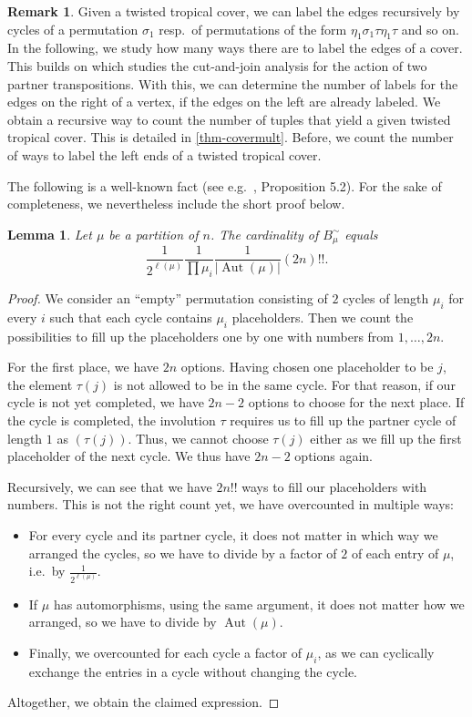 \documentclass[11pt]{article}
\newtheorem{lemma}[theo]{Lemma}
\theoremstyle{definition}
\newtheorem{rema}[theo]{Remark}
\numberwithin{equation}{section}
\DeclareMathOperator{\Aut}{Aut}
\begin{document}
\begin{rema}
    Given a twisted tropical cover, we can label the edges recursively by cycles of a permutation $\sigma_1$ resp.\ of permutations of the form $\eta_1\sigma_1\tau\eta_1\tau$ and so on. In the following, we study how many ways there are to label the edges of a cover. This builds on \cite[Theorem 2.12]{BF21} which studies the cut-and-join analysis for the action of two partner transpositions. With this, we can determine the number of labels for the edges on the right of a vertex, if the edges on the left are already labeled. We obtain a recursive way to count the number of tuples that yield a given twisted tropical cover. This is detailed in \cref{thm-covermult}. Before, we count the number of ways to label the left ends of a twisted tropical cover.
\end{rema}

The following is a well-known fact (see e.g.~\cite{goulden1996connection}, Proposition 5.2). For the sake of completeness, we nevertheless include the short proof below.
\begin{lemma}
\label{lem-conjclass}
Let $\mu$ be a partition of $n$.
The cardinality of $B^\sim_\mu$ equals
$$ \frac{1}{2^{\ell(\mu)}} \frac{1}{\prod \mu_i} \frac{1}{|\Aut(\mu)|}(2n)!! .$$
\end{lemma}

\begin{proof}
We consider an ``empty'' permutation consisting of $2$ cycles of length $\mu_i$ for every $i$ such that each cycle contains $\mu_i$ placeholders. Then we count the possibilities to fill up the placeholders one by one with numbers from $1,\ldots,2n$.

For the first place, we have $2n$ options. 
Having chosen one placeholder to be $j$, the element $\tau(j)$ is not allowed to be in the same cycle. For that reason, if our cycle is not yet completed, we have $2n-2$ options to choose for the next place. If the cycle is completed, the involution $\tau$ requires us to fill up the partner cycle of length $1$ as $(\tau(j))$. Thus, we cannot choose $\tau(j)$ either as we fill up the first placeholder of the next cycle. We thus have $2n-2$ options again.

Recursively, we can see that we have $2n!!$ ways to fill our placeholders with numbers. This is not the right count yet, we have overcounted in multiple ways:
\begin{itemize}
    \item For every cycle and its partner cycle, it does not matter in which way we arranged the cycles, so we have to divide by a factor of $2$ of each entry of $\mu$, i.e.\ by $\frac{1}{2^{\ell(\mu)}}$.
    \item If $\mu$ has automorphisms, using the same argument, it does not matter how we arranged, so we have to divide by $\Aut(\mu)$.
    \item Finally, we overcounted for each cycle a factor of $\mu_i$, as we can cyclically exchange the entries in a cycle without changing the cycle.
\end{itemize}
Altogether, we obtain the claimed expression.
\end{proof}
\end{document}
